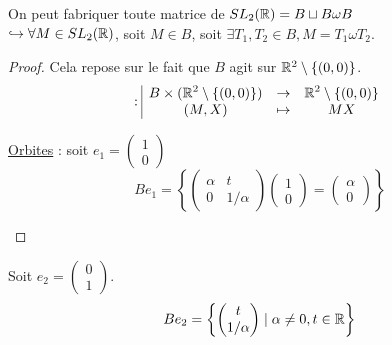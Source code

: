 \begin{theoreme}{}{}
    On peut fabriquer toute matrice de $SL_2(\mathbb{R}) = B \sqcup B \omega B$ \\
    $\hookrightarrow \forall M \in SL_2(\mathbb{R})$, soit $M \in B$, soit $\exists T_1, T_2 \in B, M = T_1 \omega T_2$.
\end{theoreme}

\begin{proof}
    Cela repose sur le fait que $B$ agit sur $\mathbb{R}^2 \setminus \{(0,0)\}$.
    \[ 
         : \space \begin{array}{|ccc} \displaystyle B \times (\mathbb{R}^2 \setminus \{(0,0)\}) & \to & \displaystyle \mathbb{R}^2 \setminus \{(0,0)\} \\ \displaystyle (M, X) & \mapsto & \displaystyle MX \end{array} 
    \]

    \uline{Orbites} : soit $e_1 = \begin{pmatrix} 1 \\ 0 \end{pmatrix}$
    \[ 
        B e_1 = \left\{ \begin{pmatrix} \alpha & t \\ 0 & 1/\alpha \end{pmatrix} \begin{pmatrix} 1 \\ 0 \end{pmatrix} = \begin{pmatrix} \alpha \\ 0 \end{pmatrix} \right\} 
    \]

    \begin{center}
    \end{center}
\end{proof}

Soit $e_2 = \begin{pmatrix} 0 \\ 1 \end{pmatrix}$. 
\[ B e_2 = \left\{ \begin{pmatrix} t \\ 1/\alpha \end{pmatrix} \mid \alpha \neq 0, t \in \mathbb{R} \right\} \]

